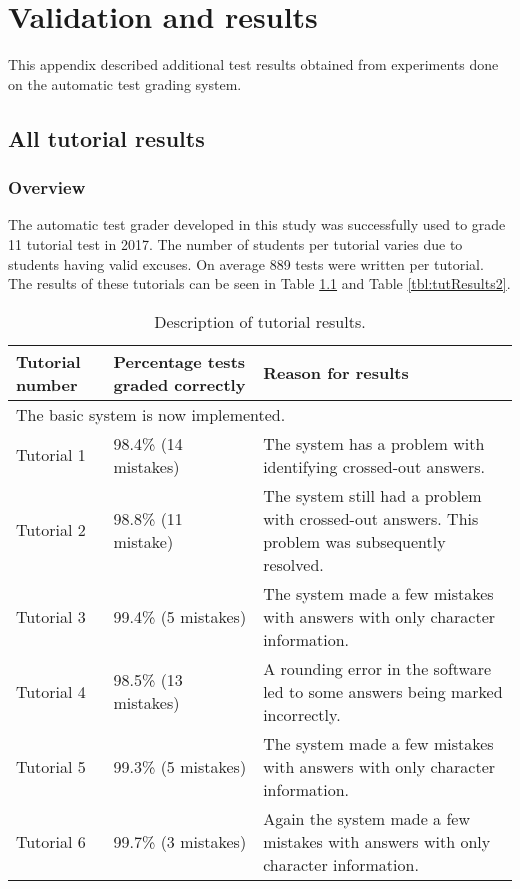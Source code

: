 \chapter{Validation and results}
\label{ap:results}
\graphicspath{{Appendix5/Appendix5figures/}}

This appendix described additional test results obtained from experiments done on the automatic test grading system.

\section{All tutorial results}
\label{sec:tutorialResults}

\subsection{Overview}

The automatic test grader developed in this study was successfully used to grade 11 tutorial test in 2017. The number of students per tutorial varies due to students having valid excuses. On average 889 tests were written per tutorial. The results of these tutorials can be seen in Table \ref{tbl:tutResults} and Table \ref{tbl:tutResults2}.

\begin{table}
\caption{Description of tutorial results.} \label{tbl:tutResults}
  \centering
\begin{tabular}{|p{2cm}|p{4cm}|p{5cm}|}
\hline
\textbf{Tutorial number}&\textbf{Percentage tests graded correctly}&\textbf{Reason for results}\\
\hline
\multicolumn{3}{|l|}{The basic system is now implemented.}\\
\hline
Tutorial 1&98.4\% (14 mistakes)&The system has a problem with identifying crossed-out answers.\\
\hline
Tutorial 2&98.8\% (11 mistake)&The system still had a problem with crossed-out answers.  This problem was subsequently resolved.\\
\hline
Tutorial 3&99.4\% (5 mistakes)&The system made a few mistakes with answers with only character information.\\
\hline
Tutorial 4&98.5\% (13 mistakes)&A rounding error in the software led to some answers being marked incorrectly.\\
\hline
Tutorial 5&99.3\% (5 mistakes)&The system made a few mistakes with answers with only character information.\\
\hline
Tutorial 6&99.7\% (3 mistakes)&Again the system made a few mistakes with answers with only character information.\\
\hline
\end{tabular} 
\end{table}

